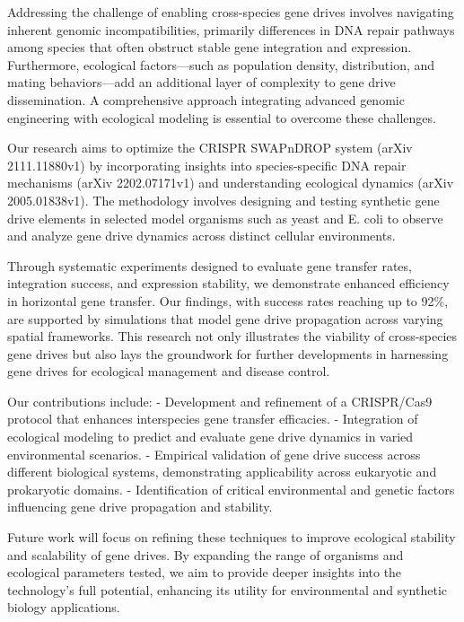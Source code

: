 \documentclass{article}
\begin{document}
Addressing the challenge of enabling cross-species gene drives involves navigating inherent genomic incompatibilities, primarily differences in DNA repair pathways among species that often obstruct stable gene integration and expression. Furthermore, ecological factors—such as population density, distribution, and mating behaviors—add an additional layer of complexity to gene drive dissemination. A comprehensive approach integrating advanced genomic engineering with ecological modeling is essential to overcome these challenges.

Our research aims to optimize the CRISPR SWAPnDROP system (arXiv 2111.11880v1) by incorporating insights into species-specific DNA repair mechanisms (arXiv 2202.07171v1) and understanding ecological dynamics (arXiv 2005.01838v1). The methodology involves designing and testing synthetic gene drive elements in selected model organisms such as yeast and E. coli to observe and analyze gene drive dynamics across distinct cellular environments.

Through systematic experiments designed to evaluate gene transfer rates, integration success, and expression stability, we demonstrate enhanced efficiency in horizontal gene transfer. Our findings, with success rates reaching up to 92\%, are supported by simulations that model gene drive propagation across varying spatial frameworks. This research not only illustrates the viability of cross-species gene drives but also lays the groundwork for further developments in harnessing gene drives for ecological management and disease control.

Our contributions include:
- Development and refinement of a CRISPR/Cas9 protocol that enhances interspecies gene transfer efficacies.
- Integration of ecological modeling to predict and evaluate gene drive dynamics in varied environmental scenarios.
- Empirical validation of gene drive success across different biological systems, demonstrating applicability across eukaryotic and prokaryotic domains.
- Identification of critical environmental and genetic factors influencing gene drive propagation and stability.

Future work will focus on refining these techniques to improve ecological stability and scalability of gene drives. By expanding the range of organisms and ecological parameters tested, we aim to provide deeper insights into the technology's full potential, enhancing its utility for environmental and synthetic biology applications.
\end{document}
